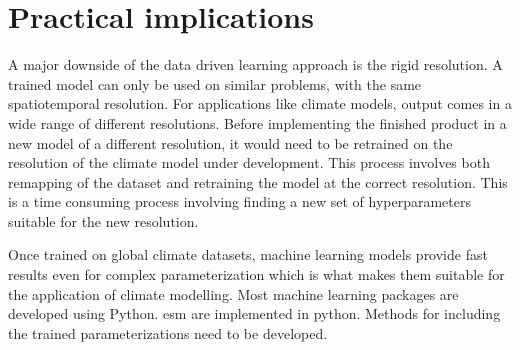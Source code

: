 \section{Practical implications} \label{sec:practical_implications}

A major downside of the data driven learning approach is the rigid resolution. A trained model can only be used on similar problems, with the same spatiotemporal resolution. For applications like climate models, output comes in a wide range of different resolutions. Before implementing the finished product in a new model of a different resolution, it would need to be retrained on the resolution of the climate model under development. This process involves both remapping of the dataset and retraining the model at the correct resolution. This is a time consuming process involving finding a new set of hyperparameters suitable for the new resolution. %

Once trained on global climate datasets, machine learning models provide fast results even for complex parameterization which is what makes them suitable for the application of climate modelling. Most machine learning packages are developed using Python. \acrfull{esm} are implemented in python. Methods for including the trained parameterizations need to be developed.

